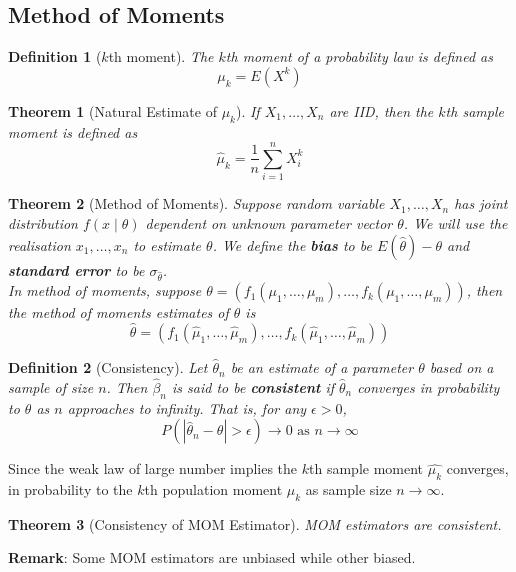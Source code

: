 \documentclass[12pt]{article}
\newtheorem{definition}{Definition}[section]
\newtheorem{theorem}{Theorem}[section]
\theoremstyle{definition}
\begin{document}
\subsection{Method of Moments}
\begin{definition}[{$k$}th moment]
\normalfont The $k$th moment of a probability law is defined as 
\[
\mu_k = E(X^k)
\]
\end{definition}
\begin{theorem}[Natural Estimate of {$\mu_k$}]
\normalfont If $X_1,\ldots, X_n$ are IID, then the $k$th sample moment is defined as
\[
\hat{\mu}_k=\frac{1}{n}\sum_{i=1}^n X_i^k
\]
\end{theorem}
\begin{theorem}[Method of Moments]
\normalfont Suppose random variable $X_1,\ldots, X_n$ has joint distribution $f(x\mid \theta)$ dependent on unknown parameter vector $\theta$. We will use the realisation $x_1,\ldots, x_n$ to estimate $\theta$. We define the \textbf{bias} to be $E(\hat{\theta})-\theta$ and \textbf{standard error} to be $\sigma_{\hat{\theta}}$.\\
In method of moments, suppose $\theta = (f_1(\mu_1,\ldots, \mu_m),\ldots, f_k(\mu_1,\ldots, \mu_m))$, then the method of moments estimates of $\theta$ is
\[
\hat{\theta}=(f_1(\hat{\mu}_1,\ldots, \hat{\mu}_m),\ldots, f_k(\hat{\mu}_1,\ldots, \hat{\mu}_m))
\]
\end{theorem}
\begin{definition}[Consistency]
\normalfont Let $\hat{\theta}_n$ be an estimate of a parameter $\theta$ based on a sample of size $n$. Then $\hat{\beta}_n$ is said to be \textbf{consistent} if $\hat{\theta}_n$ converges in probability to $\theta$ as $n$ approaches to infinity. That is, for any $\epsilon>0$,
\[
P(|\hat{\theta}_n-\theta|>\epsilon)\to 0\text{ as }n\to\infty
\]
\end{definition}
Since the weak law of large number implies the $k$th sample moment $\hat{\mu_k}$ converges, in probability to the $k$th population moment $\mu_k$ as sample size $n\to\infty$.
\begin{theorem}[Consistency of MOM Estimator]
\normalfont MOM estimators are consistent.
\end{theorem}
\textbf{Remark}: Some MOM estimators are unbiased while other biased.
\end{document}
